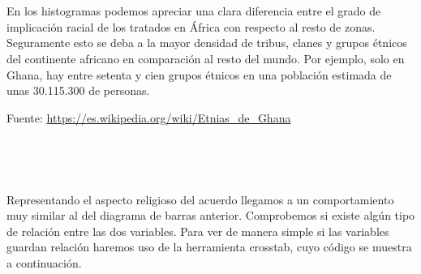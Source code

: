 \documentclass[11pt]{article}
\begin{document}
    \begin{center}
    \end{center}
    { \hspace*{\fill} \\}
    
    \begin{center}
    \end{center}
    { \hspace*{\fill} \\}
    
    En los histogramas podemos apreciar una clara diferencia entre el grado
de implicación racial de los tratados en África con respecto al resto de
zonas. Seguramente esto se deba a la mayor densidad de tribus, clanes y
grupos étnicos del continente africano en comparación al resto del
mundo. Por ejemplo, solo en Ghana, hay entre setenta y cien grupos
étnicos en una población estimada de unas 30.115.300 de personas.

Fuente: \url{https://es.wikipedia.org/wiki/Etnias\_de\_Ghana}

    \begin{center}
    \end{center}
    { \hspace*{\fill} \\}
    
    \begin{center}
    \end{center}
    { \hspace*{\fill} \\}
    
    Representando el aspecto religioso del acuerdo llegamos a un comportamiento muy similar al del diagrama de barras anterior. 
Comprobemos si existe algún tipo de relación entre las dos variables. Para ver de manera simple si las variables guardan relación haremos uso de la herramienta crosstab, cuyo código se muestra a continuación.
\end{document}
